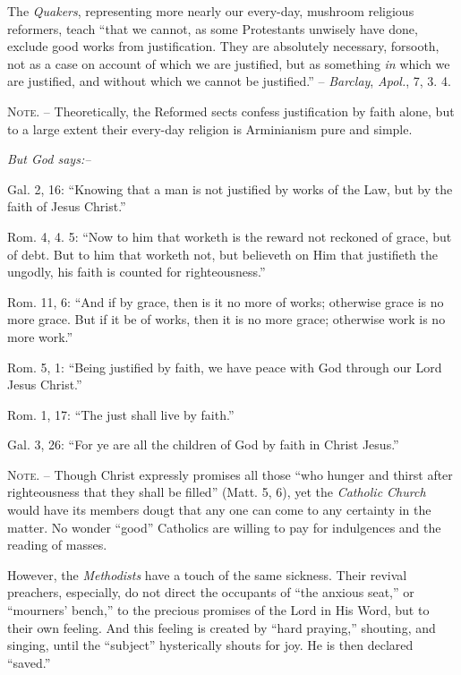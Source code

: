\documentclass[
]{book}
\begin{document}
The \emph{Quakers}, representing more nearly our every-day, mushroom religious reformers, teach ``that we cannot, as some Protestants unwisely have done, exclude good works from justification. They are absolutely necessary, forsooth, not as a case on account of which we are justified, but as something \emph{in} which we are justified, and without which we cannot be justified.'' -- \emph{Barclay}, \emph{Apol.}, 7, 3. 4.

\textsc{Note.} -- Theoretically, the Reformed sects confess justification by faith alone, but to a large extent their every-day religion is Arminianism pure and simple.

\begin{center}
\textsl{But God says:--}
\end{center}

Gal. 2, 16: ``Knowing that a man is not justified by works of the Law, but by the faith of Jesus Christ.''

Rom. 4, 4. 5: ``Now to him that worketh is the reward not reckoned of grace, but of debt. But to him that worketh not, but believeth on Him that justifieth the ungodly, his faith is counted for righteousness.''

Rom. 11, 6: ``And if by grace, then is it no more of works; otherwise grace is no more grace. But if it be of works, then it is no more grace; otherwise work is no more work.''

Rom. 5, 1: ``Being justified by faith, we have peace with God through our Lord Jesus Christ.''

Rom. 1, 17: ``The just shall live by faith.''

Gal. 3, 26: ``For ye are all the children of God by faith in Christ Jesus.''

\textsc{Note.} -- Though Christ expressly promises all those ``who hunger and thirst after righteousness that they shall be filled'' (Matt. 5, 6), yet the \emph{Catholic Church} would have its members dougt that any one can come to any certainty in the matter. No wonder ``good'' Catholics are willing to pay for indulgences and the reading of masses.

However, the \emph{Methodists} have a touch of the same sickness. Their revival preachers, especially, do not direct the occupants of ``the anxious seat,'' or ``mourners' bench,'' to the precious promises of the Lord in His Word, but to their own feeling. And this feeling is created by ``hard praying,'' shouting, and singing, until the ``subject'' hysterically shouts for joy. He is then declared ``saved.''
\end{document}
